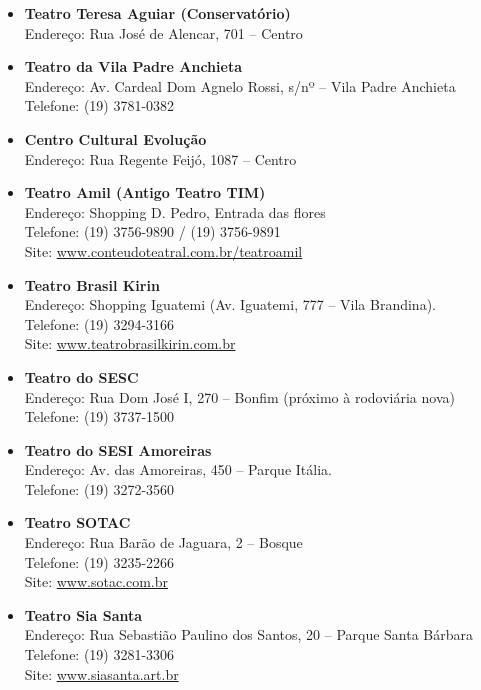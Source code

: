 \begin{itemize}
     \item   \textbf{Teatro Teresa Aguiar (Conservatório)}
         \\Endereço: Rua José de Alencar, 701 -- Centro

    \item   \textbf{Teatro da Vila Padre Anchieta}
        \\Endereço: Av. Cardeal Dom Agnelo Rossi, s/nº -- Vila Padre Anchieta
        \\Telefone: (19) 3781-0382

     \item   \textbf{Centro Cultural Evolução}
         \\Endereço: Rua Regente Feijó, 1087 -- Centro

    \item   \textbf{Teatro Amil (Antigo Teatro TIM)}
        \\Endereço: Shopping D. Pedro, Entrada das flores
        \\Telefone: (19) 3756-9890 / (19) 3756-9891
		\\Site: \url{www.conteudoteatral.com.br/teatroamil}

    \item   \textbf{Teatro Brasil Kirin}
		\\Endereço: Shopping Iguatemi (Av. Iguatemi, 777 -- Vila Brandina).
		\\Telefone: (19) 3294-3166
		\\Site: \url{www.teatrobrasilkirin.com.br}

    \item   \textbf{Teatro do SESC}
		\\Endereço: Rua Dom José I, 270 -- Bonfim (próximo à rodoviária nova)
		\\Telefone: (19) 3737-1500

    \item   \textbf{Teatro do SESI Amoreiras}
		\\Endereço: Av. das Amoreiras, 450 -- Parque Itália.
		\\Telefone: (19) 3272-3560

    \item   \textbf{Teatro SOTAC}
		\\Endereço: Rua Barão de Jaguara, 2 -- Bosque
		\\Telefone: (19) 3235-2266
		\\Site: \url{www.sotac.com.br}

    \item   \textbf{Teatro Sia Santa}
		\\Endereço: Rua Sebastião Paulino dos Santos, 20 -- Parque Santa Bárbara
		\\Telefone: (19) 3281-3306
		\\Site: \url{www.siasanta.art.br}
\end{itemize}

